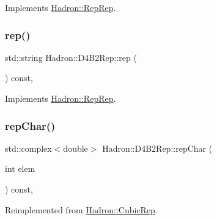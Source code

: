 Implements \mbox{\hyperlink{structHadron_1_1RepRep_ab3213025f6de249f7095892109575fde}{Hadron\+::\+Rep\+Rep}}.

\mbox{\label{structHadron_1_1D4B2Rep_ac78aafe72fe015abb9639b5c380be490}} 
\subsubsection{\texorpdfstring{rep()}{rep()}\hspace{0.1cm}{\footnotesize\ttfamily [3/3]}}
{\footnotesize\ttfamily std\+::string Hadron\+::\+D4\+B2\+Rep\+::rep (\begin{DoxyParamCaption}{ }\end{DoxyParamCaption}) const\hspace{0.3cm}{\ttfamily [inline]}, {\ttfamily [virtual]}}



Implements \mbox{\hyperlink{structHadron_1_1RepRep_ab3213025f6de249f7095892109575fde}{Hadron\+::\+Rep\+Rep}}.

\mbox{\label{structHadron_1_1D4B2Rep_a23d3d1b8d91d37f5d2c70f3ea7950ab7}} 
\subsubsection{\texorpdfstring{repChar()}{repChar()}\hspace{0.1cm}{\footnotesize\ttfamily [1/2]}}
{\footnotesize\ttfamily std\+::complex$<$double$>$ Hadron\+::\+D4\+B2\+Rep\+::rep\+Char (\begin{DoxyParamCaption}\item[{int}]{elem }\end{DoxyParamCaption}) const\hspace{0.3cm}{\ttfamily [inline]}, {\ttfamily [virtual]}}



Reimplemented from \mbox{\hyperlink{structHadron_1_1CubicRep_af45227106e8e715e84b0af69cd3b36f8}{Hadron\+::\+Cubic\+Rep}}.

